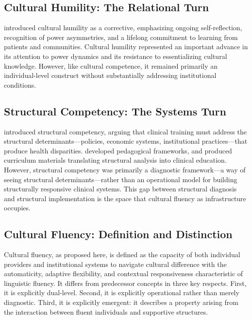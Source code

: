 \documentclass[12pt, a4paper]{article}
\begin{document}
\subsection{Cultural Humility: The Relational Turn}

\citet{tervalon1998} introduced cultural humility as a corrective, emphasizing ongoing self-reflection, recognition of power asymmetries, and a lifelong commitment to learning from patients and communities. Cultural humility represented an important advance in its attention to power dynamics and its resistance to essentializing cultural knowledge. However, like cultural competence, it remained primarily an individual-level construct without substantially addressing institutional conditions.

\subsection{Structural Competency: The Systems Turn}

\citet{metzl2014} introduced structural competency, arguing that clinical training must address the structural determinants---policies, economic systems, institutional practices---that produce health disparities. \citet{metzl2018} developed pedagogical frameworks, and \citet{neff2020} produced curriculum materials translating structural analysis into clinical education. However, structural competency was primarily a diagnostic framework---a way of seeing structural determinants---rather than an operational model for building structurally responsive clinical systems. This gap between structural diagnosis and structural implementation is the space that cultural fluency as infrastructure occupies.

\subsection{Cultural Fluency: Definition and Distinction}

Cultural fluency, as proposed here, is defined as the capacity of both individual providers and institutional systems to navigate cultural difference with the automaticity, adaptive flexibility, and contextual responsiveness characteristic of linguistic fluency. It differs from predecessor concepts in three key respects. First, it is explicitly dual-level. Second, it is explicitly operational rather than merely diagnostic. Third, it is explicitly emergent: it describes a property arising from the interaction between fluent individuals and supportive structures.
\end{document}
